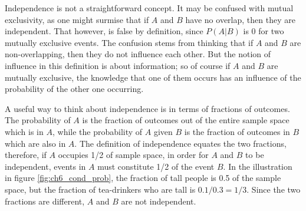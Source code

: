 \documentclass[
  letterpaper,
  DIV=11,
  numbers=noendperiod]{scrreprt}
\begin{document}
Independence is not a straightforward concept. It may be confused with
mutual exclusivity, as one might surmise that if \(A\) and \(B\) have no
overlap, then they are independent. That however, is false by
definition, since \(P(A|B)\) is 0 for two mutually exclusive events. The
confusion stems from thinking that if \(A\) and \(B\) are
non-overlapping, then they do not influence each other. But the notion
of influence in this definition is about information; so of course if
\(A\) and \(B\) are mutually exclusive, the knowledge that one of them
occurs has an influence of the probability of the other one occurring.

A useful way to think about independence is in terms of fractions of
outcomes. The probability of \(A\) is the fraction of outcomes out of
the entire sample space which is in \(A\), while the probability of
\(A\) given \(B\) is the fraction of outcomes in \(B\) which are also in
\(A\). The definition of independence equates the two fractions,
therefore, if \(A\) occupies 1/2 of sample space, in order for \(A\) and
\(B\) to be independent, events in \(A\) must constitute 1/2 of the
event \(B\). In the illustration in figure \ref{fig:ch6_cond_prob}, the
fraction of tall people is 0.5 of the sample space, but the fraction of
tea-drinkers who are tall is \(0.1/0.3=1/3\). Since the two fractions
are different, \(A\) and \(B\) are not independent.
\end{document}
